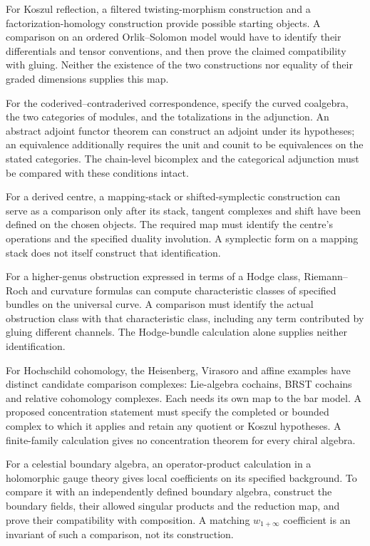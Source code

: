 For Koszul reflection, a filtered twisting-morphism construction and a
factorization-homology construction provide possible starting objects.
A comparison on an ordered Orlik--Solomon model would have to identify
their differentials and tensor conventions, and then prove the claimed
compatibility with gluing. Neither the existence of the two constructions
nor equality of their graded dimensions supplies this map.

For the coderived--contraderived correspondence, specify the curved
coalgebra, the two categories of modules, and the totalizations in the
adjunction. An abstract adjoint functor theorem can construct an adjoint
under its hypotheses; an equivalence additionally requires the unit and
counit to be equivalences on the stated categories. The chain-level
bicomplex and the categorical adjunction must be compared with these
conditions intact.

For a derived centre, a mapping-stack or shifted-symplectic construction
can serve as a comparison only after its stack, tangent complexes and
shift have been defined on the chosen objects. The required map must
identify the centre's operations and the specified duality involution.
A symplectic form on a mapping stack does not itself construct that
identification.

For a higher-genus obstruction expressed in terms of a Hodge class,
Riemann--Roch and curvature formulas can compute characteristic classes
of specified bundles on the universal curve. A comparison must identify
the actual obstruction class with that characteristic class, including
any term contributed by gluing different channels. The Hodge-bundle
calculation alone supplies neither identification.

For Hochschild cohomology, the Heisenberg, Virasoro and affine examples
have distinct candidate comparison complexes: Lie-algebra cochains,
BRST cochains and relative cohomology complexes. Each needs its own map
to the bar model. A proposed concentration statement must specify the
completed or bounded complex to which it applies and retain any
quotient or Koszul hypotheses. A finite-family calculation gives no
concentration theorem for every chiral algebra.

For a celestial boundary algebra, an operator-product calculation in a
holomorphic gauge theory gives local coefficients on its specified
background. To compare it with an independently defined boundary
algebra, construct the boundary fields, their allowed singular products
and the reduction map, and prove their compatibility with composition.
A matching \(w_{1+\infty}\) coefficient is an invariant of such a
comparison, not its construction.

